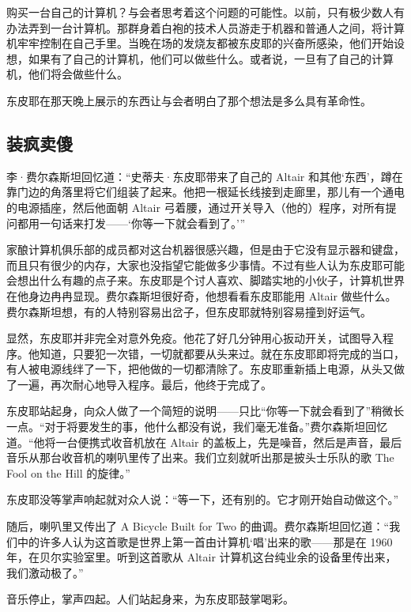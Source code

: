 \documentclass[12pt,UTF8]{ctexbook}
\begin{document}
购买一台自己的计算机？与会者思考着这个问题的可能性。以前，只有极少数人有办法弄到一台计算机。那群身着白袍的技术人员游走于机器和普通人之间，将计算机牢牢控制在自己手里。当晚在场的发烧友都被东皮耶的兴奋所感染，他们开始设想，如果有了自己的计算机，他们可以做些什么。或者说，一旦有了自己的计算机，他们将会做些什么。

东皮耶在那天晚上展示的东西让与会者明白了那个想法是多么具有革命性。





\subsection{装疯卖傻}


李·费尔森斯坦回忆道：“史蒂夫·东皮耶带来了自己的 Altair 和其他‘东西’，蹲在靠门边的角落里将它们组装了起来。他把一根延长线接到走廊里，那儿有一个通电的电源插座，然后他面朝 Altair 弓着腰，通过开关导入（他的）程序，对所有提问都用一句话来打发——‘你等一下就会看到了。’”

家酿计算机俱乐部的成员都对这台机器很感兴趣，但是由于它没有显示器和键盘，而且只有很少的内存，大家也没指望它能做多少事情。不过有些人认为东皮耶可能会想出什么有趣的点子来。东皮耶是个讨人喜欢、脚踏实地的小伙子，计算机世界在他身边冉冉显现。费尔森斯坦很好奇，他想看看东皮耶能用 Altair 做些什么。费尔森斯坦想，有的人特别容易出岔子，但东皮耶就特别容易撞到好运气。

显然，东皮耶并非完全对意外免疫。他花了好几分钟用心扳动开关，试图导入程序。他知道，只要犯一次错，一切就都要从头来过。就在东皮耶即将完成的当口，有人被电源线绊了一下，把他做的一切都清除了。东皮耶重新插上电源，从头又做了一遍，再次耐心地导入程序。最后，他终于完成了。

东皮耶站起身，向众人做了一个简短的说明——只比“你等一下就会看到了”稍微长一点。“对于将要发生的事，他什么都没有说，我们毫无准备。”费尔森斯坦回忆道。“他将一台便携式收音机放在 Altair 的盖板上，先是噪音，然后是声音，最后音乐从那台收音机的喇叭里传了出来。我们立刻就听出那是披头士乐队的歌 The Fool on the Hill 的旋律。”

东皮耶没等掌声响起就对众人说：“等一下，还有别的。它才刚开始自动做这个。”

随后，喇叭里又传出了 A Bicycle Built for Two 的曲调。费尔森斯坦回忆道：“我们中的许多人认为这首歌是世界上第一首由计算机‘唱’出来的歌——那是在 1960 年，在贝尔实验室里。听到这首歌从 Altair 计算机这台纯业余的设备里传出来，我们激动极了。”

音乐停止，掌声四起。人们站起身来，为东皮耶鼓掌喝彩。
\end{document}
